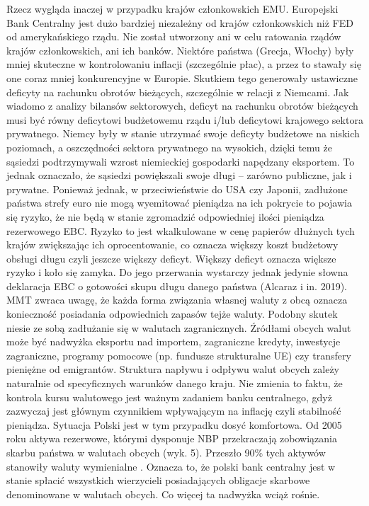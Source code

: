 \documentclass[
]{book}
\begin{document}
Rzecz wygląda inaczej w przypadku krajów członkowskich EMU. Europejski Bank Centralny jest dużo bardziej niezależny od krajów członkowskich niż FED od amerykańskiego rządu. Nie został utworzony ani w celu ratowania rządów krajów członkowskich, ani ich banków. Niektóre państwa (Grecja, Włochy) były mniej skuteczne w kontrolowaniu inflacji (szczególnie płac), a przez to stawały się one coraz mniej konkurencyjne w Europie. Skutkiem tego generowały ustawiczne deficyty na rachunku obrotów bieżących, szczególnie w relacji z Niemcami. Jak wiadomo z analizy bilansów sektorowych, deficyt na rachunku obrotów bieżących musi być równy deficytowi budżetowemu rządu i/lub deficytowi krajowego sektora prywatnego. Niemcy były w stanie utrzymać swoje deficyty budżetowe na niskich poziomach, a oszczędności sektora prywatnego na wysokich, dzięki temu że sąsiedzi podtrzymywali wzrost niemieckiej gospodarki napędzany eksportem. To jednak oznaczało, że sąsiedzi powiększali swoje długi -- zarówno publiczne, jak i prywatne. Ponieważ jednak, w przeciwieństwie do USA czy Japonii, zadłużone państwa strefy euro nie mogą wyemitować pieniądza na ich pokrycie to pojawia się ryzyko, że nie będą w stanie zgromadzić odpowiedniej ilości pieniądza rezerwowego EBC. Ryzyko to jest wkalkulowane w cenę papierów dłużnych tych krajów zwiększając ich oprocentowanie, co oznacza większy koszt budżetowy obsługi długu czyli jeszcze większy deficyt. Większy deficyt oznacza większe ryzyko i koło się zamyka. Do jego przerwania wystarczy jednak jedynie słowna deklaracja EBC o gotowości skupu długu danego państwa (Alcaraz i in. 2019).
MMT zwraca uwagę, że każda forma związania własnej waluty z obcą oznacza konieczność posiadania odpowiednich zapasów tejże waluty. Podobny skutek niesie ze sobą zadłużanie się w walutach zagranicznych. Źródłami obcych walut może być nadwyżka eksportu nad importem, zagraniczne kredyty, inwestycje zagraniczne, programy pomocowe (np. fundusze strukturalne UE) czy transfery pieniężne od emigrantów. Struktura napływu i odpływu walut obcych zależy naturalnie od specyficznych warunków danego kraju. Nie zmienia to faktu, że kontrola kursu walutowego jest ważnym zadaniem banku centralnego, gdyż zazwyczaj jest głównym czynnikiem wpływającym na inflację czyli stabilność pieniądza.
Sytuacja Polski jest w tym przypadku dosyć komfortowa. Od 2005 roku aktywa rezerwowe, którymi dysponuje NBP przekraczają zobowiązania skarbu państwa w walutach obcych (wyk. 5). Przeszło 90\% tych aktywów stanowiły waluty wymienialne . Oznacza to, że polski bank centralny jest w stanie spłacić wszystkich wierzycieli posiadających obligacje skarbowe denominowane w walutach obcych. Co więcej ta nadwyżka wciąż rośnie.
\end{document}
